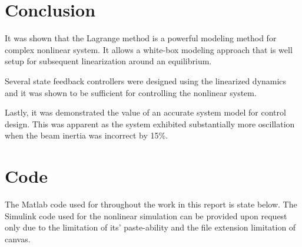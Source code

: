 \documentclass[a4paper, titlepage]{article}
\begin{document}
\section{Conclusion}
It was shown that the Lagrange method is a powerful modeling method for complex nonlinear system. It allows a white-box modeling approach that is well setup for subsequent linearization around an equilibrium.

Several state feedback controllers were designed using the linearized dynamics and it was shown to be sufficient for controlling the nonlinear system.

Lastly, it was demonstrated the value of an accurate system model for control design.
This was apparent as the system exhibited substantially more oscillation when the beam inertia was incorrect by 15\%.


\clearpage


\clearpage
\appendix

\section{Code}
The Matlab code used for throughout the work in this report is state below.
The Simulink code used for the nonlinear simulation can be provided upon request only due to the limitation of its' paste-ability and the file extension limitation of canvas.


\end{document}

